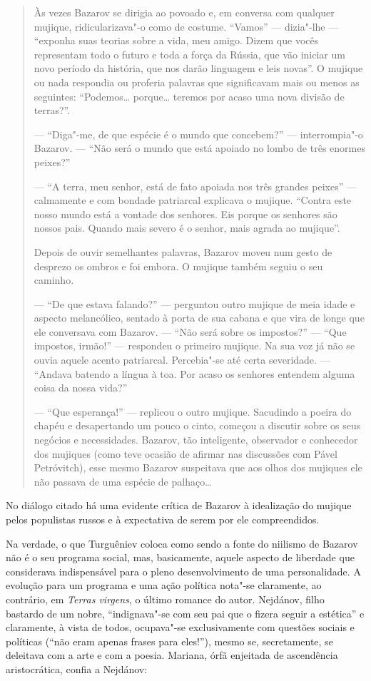 \begin{quote}
Às vezes Bazarov se dirigia ao povoado e, em conversa com qualquer
mujique, ridicularizava"-o como de costume. ``Vamos'' --- dizia"-lhe --- ``exponha
suas teorias sobre a vida, meu amigo. Dizem que vocês representam todo o
futuro e toda a força da Rússia, que vão iniciar um novo período da
história, que nos darão linguagem e leis novas''. O mujique ou nada
respondia ou proferia palavras que significavam mais ou menos as
seguintes: ``Podemos\ldots{} porque\ldots{} teremos por acaso uma nova divisão
de terras?''.

--- ``Diga"-me, de que espécie é o mundo que concebem?'' --- interrompia"-o
Bazarov. --- ``Não será o mundo que está apoiado no lombo de três enormes
peixes?''

--- ``A terra, meu senhor, está de fato apoiada nos três grandes peixes'' ---
calmamente e com bondade patriarcal explicava o mujique. ``Contra este
nosso mundo está a vontade dos senhores. Eis porque os senhores são
nossos pais. Quando mais severo é o senhor, mais agrada ao mujique''.

Depois de ouvir semelhantes palavras, Bazarov moveu num gesto de
desprezo os ombros e foi embora. O mujique também seguiu o seu caminho.

--- ``De que estava falando?'' --- perguntou outro mujique de meia idade e
aspecto melancólico, sentado à porta de sua cabana e que vira de longe
que ele conversava com Bazarov. --- ``Não será sobre os impostos?'' --- ``Que
impostos, irmão!'' --- respondeu o primeiro mujique. Na sua voz já não se
ouvia aquele acento patriarcal. Percebia"-se até certa severidade. ---
``Andava batendo a língua à toa. Por acaso os senhores entendem alguma
coisa da nossa vida?''

--- ``Que esperança!'' --- replicou o outro mujique. Sacudindo a poeira do
chapéu e desapertando um pouco o cinto, começou a discutir sobre os seus
negócios e necessidades. Bazarov, tão inteligente, observador e
conhecedor dos mujiques (como teve ocasião de afirmar nas discussões com
Pável Petróvitch), esse mesmo Bazarov suspeitava que aos olhos dos
mujiques ele não passava de uma espécie de palhaço\ldots{}
\end{quote}

No diálogo citado há uma evidente crítica de Bazarov à idealização do
mujique pelos populistas russos e à expectativa de serem por ele
compreendidos.

Na verdade, o que Turguêniev coloca como sendo a fonte do niilismo de
Bazarov não é o seu programa social, mas, basicamente, aquele aspecto
de liberdade que considerava indispensável para o pleno desenvolvimento
de uma personalidade. A evolução para um programa e uma ação política
nota"-se claramente, ao contrário, em \emph{Terras virgens}, o último
romance do autor. Nejdánov, filho bastardo de um nobre, ``indignava"-se
com seu pai que o fizera seguir a estética'' e claramente, à vista de
todos, ocupava"-se exclusivamente com questões sociais e políticas (``não
eram apenas frases para eles!''), mesmo se, secretamente, se deleitava
com a arte e com a poesia. Mariana, órfã enjeitada de ascendência
aristocrática, confia a Nejdánov:

